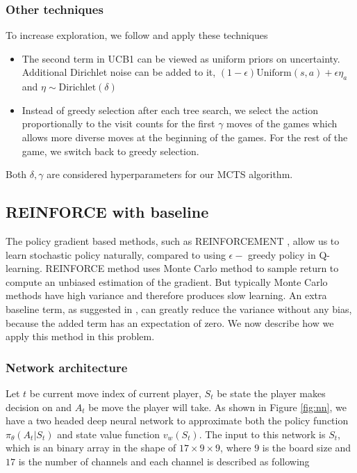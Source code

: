 \documentclass{article}
\begin{document}
\subsubsection{Other techniques}
\label{sec:othertechniques}
To increase exploration, we follow \cite{silver2017masteringalphagozero} and apply these techniques
\begin{itemize}
  \item
    The second term in UCB1 can be viewed as uniform priors on uncertainty. Additional Dirichlet noise can be added to it, $ (1-\epsilon) \text{Uniform}(s,a) + \epsilon \eta_a$ and $\eta \sim \text{Dirichlet}(\delta)$
  \item 
  Instead of greedy selection after each tree search, we select the action proportionally to the visit counts for the first $\gamma$ moves of the games which allows more diverse moves at the beginning of the games. For the rest of the game, we switch back to greedy selection.
\end{itemize}
Both $\delta, \gamma$ are considered hyperparameters for our MCTS algorithm.


\subsection{REINFORCE with baseline}
The policy gradient based methods, such as REINFORCEMENT \cite{williams1987reinforcement}, allow us to learn stochastic policy naturally, compared to using $\epsilon-$ greedy policy in Q-learning. REINFORCE method uses Monte Carlo method to sample return to compute an unbiased estimation of the gradient. But typically Monte Carlo methods have high variance and therefore produces slow learning. An extra baseline term, as suggested in \cite{sutton2018reinforcement}, can greatly reduce the variance without any bias, because the added term has an expectation of zero. We now describe how we apply this method in this problem.


\subsubsection{Network architecture}
\label{sec:nn}
Let $t$ be current move index of current player, $S_t$ be state the player makes decision on and $A_t$ be move the player will take. As shown in Figure \ref{fig:nn}, we have a two headed deep neural network to approximate both the policy function $\pi_{\theta}(A_t|S_t)$ and state value function $v_w(S_t)$.  The input to this network is $S_t$, which is an binary array in the shape of $17 \times 9 \times 9$, where $9$ is the board size and $17$ is the number of channels and each channel is described as following 
\end{document}
